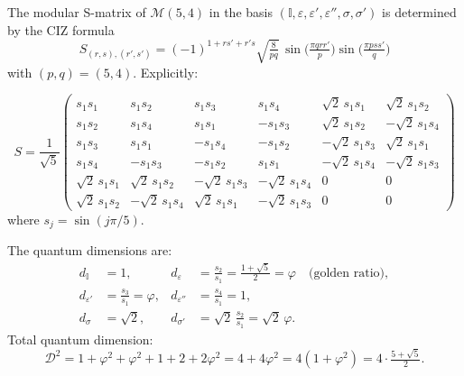 \begin{proposition}
\label{prop:tricritical-s-matrix}

The modular S-matrix of $\mathcal{M}(5,4)$ in the basis
$(\mathbb{I}, \varepsilon, \varepsilon', \varepsilon'', \sigma, \sigma')$
is determined by the CIZ formula
\[
S_{(r,s),(r',s')} = (-1)^{1+rs'+r's}\sqrt{\tfrac{8}{pq}}\,
\sin\!\bigl(\tfrac{\pi q rr'}{p}\bigr)\sin\!\bigl(\tfrac{\pi p ss'}{q}\bigr)
\]
with $(p,q) = (5,4)$. Explicitly:

\[
S = \frac{1}{\sqrt{5}}\begin{pmatrix}
s_1 s_1 & s_1 s_2 & s_1 s_3 & s_1 s_4 & \sqrt{2}\,s_1 s_1 & \sqrt{2}\,s_1 s_2 \\
s_1 s_2 & s_1 s_4 & s_1 s_1 & -s_1 s_3 & \sqrt{2}\,s_1 s_2 & -\sqrt{2}\,s_1 s_4 \\
s_1 s_3 & s_1 s_1 & -s_1 s_4 & -s_1 s_2 & -\sqrt{2}\,s_1 s_3 & \sqrt{2}\,s_1 s_1 \\
s_1 s_4 & -s_1 s_3 & -s_1 s_2 & s_1 s_1 & -\sqrt{2}\,s_1 s_4 & -\sqrt{2}\,s_1 s_3 \\
\sqrt{2}\,s_1 s_1 & \sqrt{2}\,s_1 s_2 & -\sqrt{2}\,s_1 s_3 & -\sqrt{2}\,s_1 s_4 & 0 & 0 \\
\sqrt{2}\,s_1 s_2 & -\sqrt{2}\,s_1 s_4 & \sqrt{2}\,s_1 s_1 & -\sqrt{2}\,s_1 s_3 & 0 & 0
\end{pmatrix}
\]
where $s_j = \sin(j\pi/5)$.

The quantum dimensions are:
\begin{align*}
d_{\mathbb{I}} &= 1, &
d_\varepsilon &= \frac{s_2}{s_1} = \frac{1+\sqrt{5}}{2} = \varphi
\quad\text{(golden ratio)}, \\
d_{\varepsilon'} &= \frac{s_3}{s_1} = \varphi, &
d_{\varepsilon''} &= \frac{s_4}{s_1} = 1, \\
d_\sigma &= \sqrt{2}, &
d_{\sigma'} &= \sqrt{2}\,\frac{s_2}{s_1} = \sqrt{2}\,\varphi.
\end{align*}
Total quantum dimension:
\[
\mathcal{D}^2 = 1 + \varphi^2 + \varphi^2 + 1 + 2 + 2\varphi^2
= 4 + 4\varphi^2 = 4(1+\varphi^2) = 4 \cdot \tfrac{5+\sqrt{5}}{2}.
\]
\end{proposition}


